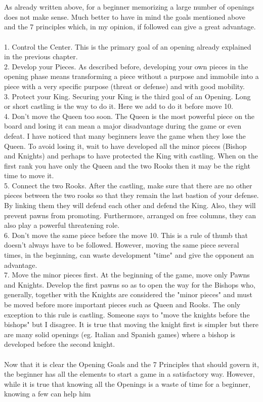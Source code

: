 \documentclass{article}
\begin{document}

\\
\\
As already written above, for a beginner memorizing a large number of openings does not make sense. Much better to have in mind the goals mentioned above and the 7 principles which, in my opinion, if followed can give a great advantage.\\\\1. Control the Center. This is the primary goal of an opening already explained in the previous chapter.\\2. Develop your Pieces. As described before, developing your own pieces in the opening phase means transforming a piece without a purpose and immobile into a piece with a very specific purpose (threat or defense) and with good mobility.\\3. Protect your King. Securing your King is the third goal of an Opening. Long or short castling is the way to do it. Here we add to do it before move 10.\\4. Don't move the Queen too soon. The Queen is the most powerful piece on the board and losing it can mean a major disadvantage during the game or even defeat. I have noticed that many beginners leave the game when they lose the Queen. To avoid losing it, wait to have developed all the minor pieces (Bishop and Knights) and perhaps to have protected the King with castling. When on the first rank you have only the Queen and the two Rooks then it may be the right time to move it.\\5. Connect the two Rooks. After the castling, make sure that there are no other pieces between the two rooks so that they remain the last bastion of your defense. By linking them they will defend each other and defend the King. Also, they will prevent pawns from promoting. Furthermore, arranged on free columns, they can also play a powerful threatening role.\\6. Don't move the same piece before the move 10. This is a rule of thumb that doesn't always have to be followed. However, moving the same piece several times, in the beginning, can waste development "time" and give the opponent an advantage.\\7. Move the minor pieces first. At the beginning of the game, move only Pawns and Knights. Develop the first pawns so as to open the way for the Bishops who, generally, together with the Knights are considered the "minor pieces" and must be moved before more important pieces such as Queen and Rooks. The only exception to this rule is castling. Someone says to "move the knights before the bishops" but I disagree. It is true that moving the knight first is simpler but there are many solid openings (eg. Italian and Spanish games) where a bishop is developed before the second knight.\\\\Now that it is clear the Opening Goals and the 7 Principles that should govern it, the beginner has all the elements to start a game in a satisfactory way. However, while it is true that knowing all the Openings is a waste of time for a beginner, knowing a few can help him 
\end{document}
